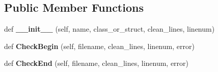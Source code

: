 \subsection*{Public Member Functions}
\begin{DoxyCompactItemize}
\item 
def {\bfseries \+\_\+\+\_\+init\+\_\+\+\_\+} (self, name, class\+\_\+or\+\_\+struct, clean\+\_\+lines, linenum)\hypertarget{classcpplint_1_1__ClassInfo_a549b13e77acbe712f79a2d2b2c98ff7d}{}\label{classcpplint_1_1__ClassInfo_a549b13e77acbe712f79a2d2b2c98ff7d}

\item 
def {\bfseries Check\+Begin} (self, filename, clean\+\_\+lines, linenum, error)\hypertarget{classcpplint_1_1__ClassInfo_abed47237f2e7416ca51cb220cfad6c1b}{}\label{classcpplint_1_1__ClassInfo_abed47237f2e7416ca51cb220cfad6c1b}

\item 
def {\bfseries Check\+End} (self, filename, clean\+\_\+lines, linenum, error)\hypertarget{classcpplint_1_1__ClassInfo_a8a61461a72928bc6ce62a9b75b770fec}{}\label{classcpplint_1_1__ClassInfo_a8a61461a72928bc6ce62a9b75b770fec}

\end{DoxyCompactItemize}
